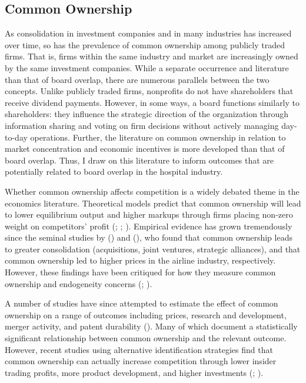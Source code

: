 \documentclass[12pt]{article}
\begin{document}
    \subsection{Common Ownership}\label{sec:commonownerlit}

    As consolidation in investment companies and in many industries has increased over time, so has the prevalence of common ownership among publicly traded firms. That is, firms within the same industry and market are increasingly owned by the same investment companies. While a separate occurrence and literature than that of board overlap, there are numerous parallels between the two concepts. Unlike publicly traded firms, nonprofits do not have shareholders that receive dividend payments. However, in some ways, a board functions similarly to shareholders: they influence the strategic direction of the organization through information sharing and voting on firm decisions without actively managing day-to-day operations. Further, the literature on common ownership in relation to market concentration and economic incentives is more developed than that of board overlap. Thus, I draw on this literature to inform outcomes that are potentially related to board overlap in the hospital industry. 
    
    Whether common ownership affects competition is a widely debated theme in the economics literature. Theoretical models predict that common ownership will lead to lower equilibrium output and higher markups through firms placing non-zero weight on competitors' profit (\cite{rubinstein1983competitive}; \cite{rotemberg1984financial}; \cite{azar2012new}). Empirical evidence has grown tremendously since the seminal studies by \citeauthor{he2017product} (\citeyear{he2017product}) and \citeauthor{azar2018anticompetitive} (\citeyear{azar2018anticompetitive}), who found that common ownership leads to greater consolidation (acquisitions, joint ventures, strategic alliances), and that common ownership led to higher prices in the airline industry, respectively. However, these findings have been critiqued for how they measure common ownership and endogeneity concerns (\cite{kennedy2017competitive}; \cite{lewellen2021does}).

    A number of studies have since attempted to estimate the effect of common ownership on a range of outcomes including prices, research and development, merger activity, and patent durability (\cite{gerardi2023critical}). Many of which document a statistically significant relationship between common ownership and the relevant outcome. However, recent studies using alternative identification strategies find that common ownership can actually increase competition through lower insider trading profits, more product development, and higher investments (\cite{chen2023does}; \cite{kini2024common}).
    
\end{document}
